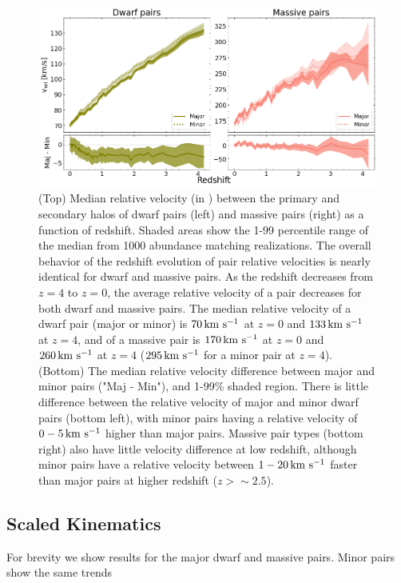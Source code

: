 \documentclass[twocolumn]{aastex631}
\begin{document}
    \begin{figure}[htp]
      \centering
      \includegraphics[width=\textwidth]{vel_1000.png}
      \caption{
        (Top) Median relative velocity (in \kms) between the primary and secondary halos of dwarf pairs (left) and massive pairs (right) as a function of redshift. 
        Shaded areas show the 1-99 percentile range of the median from 1000 abundance matching realizations. 
        The overall behavior of the redshift evolution of pair relative velocities is nearly identical for dwarf and massive pairs.
        As the redshift decreases from $z=4$ to $z=0$, the average relative velocity of a pair decreases for both dwarf and massive pairs.
        The median relative velocity of a dwarf pair (major or minor) is $70\,\mathrm{km}~\mathrm{s}^{-1}$ at $z=0$ and $133\,\mathrm{km}~\mathrm{s}^{-1}$ at $z=4$, and of a massive pair is $170\,\mathrm{km}~\mathrm{s}^{-1}$ at $z=0$ and $260\,\mathrm{km}~\mathrm{s}^{-1}$ at $z=4$ ($295\,\mathrm{km}~\mathrm{s}^{-1}$ for a minor pair at $z=4$). 
        (Bottom) The median relative velocity difference between major and minor pairs ("Maj - Min"), and 1-99\% shaded region.
        There is little difference between the relative velocity of major and minor dwarf pairs (bottom left), with minor pairs having a relative velocity of $0-5\,\mathrm{km}~\mathrm{s}^{-1}$ higher than major pairs. 
        Massive pair types (bottom right) also have little velocity difference at low redshift, although minor pairs have a relative velocity between $1-20\,\mathrm{km}~\mathrm{s}^{-1}$ faster than major pairs at higher redshift ($z>\sim 2.5$).
        }
      \label{fig:vel}
    \end{figure}

    \subsection{Scaled Kinematics}\label{sec:results-scaled}
    For brevity we show results for the major dwarf and massive pairs. Minor pairs show the same trends 
    
\end{document}

